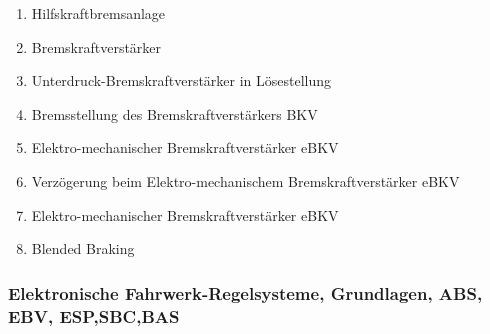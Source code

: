 \begin{enumerate}
\item
  Hilfskraftbremsanlage\\
\item
  Bremskraftverstärker\\
\item
  Unterdruck-Bremskraftverstärker in Lösestellung\\
\item
  Bremsstellung des Bremskraftverstärkers BKV\\
\item
  Elektro-mechanischer Bremskraftverstärker eBKV\\
\item
  Verzögerung beim Elektro-mechanischem Bremskraftverstärker eBKV\\
\item
  Elektro-mechanischer Bremskraftverstärker eBKV\\
\item
  Blended Braking
\end{enumerate}

\subsubsection{Elektronische Fahrwerk-Regelsysteme, Grundlagen, ABS,
EBV,
ESP,SBC,BAS}\label{elektronische-fahrwerk-regelsysteme-grundlagen-abs-ebv-espsbcbas}

